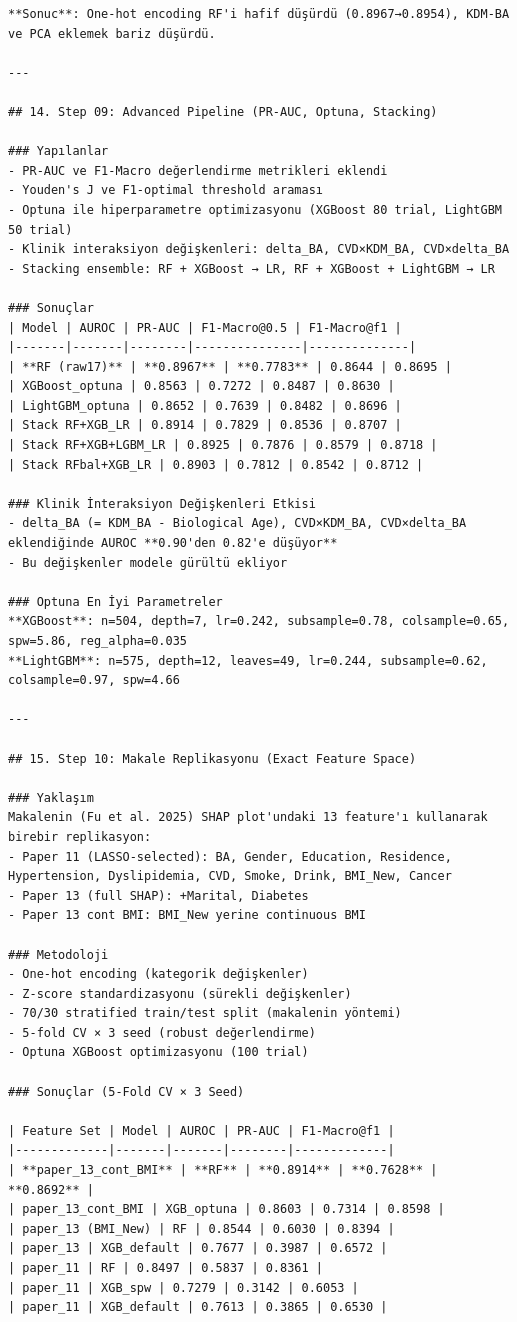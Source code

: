﻿\documentclass[11pt,a4paper]{article}
\begin{document}
\begin{verbatim}
**Sonuc**: One-hot encoding RF'i hafif düşürdü (0.8967→0.8954), KDM-BA ve PCA eklemek bariz düşürdü.

---

## 14. Step 09: Advanced Pipeline (PR-AUC, Optuna, Stacking)

### Yapılanlar
- PR-AUC ve F1-Macro değerlendirme metrikleri eklendi
- Youden's J ve F1-optimal threshold araması
- Optuna ile hiperparametre optimizasyonu (XGBoost 80 trial, LightGBM 50 trial)
- Klinik interaksiyon değişkenleri: delta_BA, CVD×KDM_BA, CVD×delta_BA
- Stacking ensemble: RF + XGBoost → LR, RF + XGBoost + LightGBM → LR

### Sonuçlar
| Model | AUROC | PR-AUC | F1-Macro@0.5 | F1-Macro@f1 |
|-------|-------|--------|---------------|--------------|
| **RF (raw17)** | **0.8967** | **0.7783** | 0.8644 | 0.8695 |
| XGBoost_optuna | 0.8563 | 0.7272 | 0.8487 | 0.8630 |
| LightGBM_optuna | 0.8652 | 0.7639 | 0.8482 | 0.8696 |
| Stack RF+XGB_LR | 0.8914 | 0.7829 | 0.8536 | 0.8707 |
| Stack RF+XGB+LGBM_LR | 0.8925 | 0.7876 | 0.8579 | 0.8718 |
| Stack RFbal+XGB_LR | 0.8903 | 0.7812 | 0.8542 | 0.8712 |

### Klinik İnteraksiyon Değişkenleri Etkisi
- delta_BA (= KDM_BA - Biological Age), CVD×KDM_BA, CVD×delta_BA eklendiğinde AUROC **0.90'den 0.82'e düşüyor**
- Bu değişkenler modele gürültü ekliyor

### Optuna En İyi Parametreler
**XGBoost**: n=504, depth=7, lr=0.242, subsample=0.78, colsample=0.65, spw=5.86, reg_alpha=0.035
**LightGBM**: n=575, depth=12, leaves=49, lr=0.244, subsample=0.62, colsample=0.97, spw=4.66

---

## 15. Step 10: Makale Replikasyonu (Exact Feature Space)

### Yaklaşım
Makalenin (Fu et al. 2025) SHAP plot'undaki 13 feature'ı kullanarak birebir replikasyon:
- Paper 11 (LASSO-selected): BA, Gender, Education, Residence, Hypertension, Dyslipidemia, CVD, Smoke, Drink, BMI_New, Cancer
- Paper 13 (full SHAP): +Marital, Diabetes
- Paper 13 cont BMI: BMI_New yerine continuous BMI

### Metodoloji
- One-hot encoding (kategorik değişkenler)
- Z-score standardizasyonu (sürekli değişkenler)
- 70/30 stratified train/test split (makalenin yöntemi)
- 5-fold CV × 3 seed (robust değerlendirme)
- Optuna XGBoost optimizasyonu (100 trial)

### Sonuçlar (5-Fold CV × 3 Seed)

| Feature Set | Model | AUROC | PR-AUC | F1-Macro@f1 |
|-------------|-------|-------|--------|-------------|
| **paper_13_cont_BMI** | **RF** | **0.8914** | **0.7628** | **0.8692** |
| paper_13_cont_BMI | XGB_optuna | 0.8603 | 0.7314 | 0.8598 |
| paper_13 (BMI_New) | RF | 0.8544 | 0.6030 | 0.8394 |
| paper_13 | XGB_default | 0.7677 | 0.3987 | 0.6572 |
| paper_11 | RF | 0.8497 | 0.5837 | 0.8361 |
| paper_11 | XGB_spw | 0.7279 | 0.3142 | 0.6053 |
| paper_11 | XGB_default | 0.7613 | 0.3865 | 0.6530 |


\end{verbatim}
\end{document}
